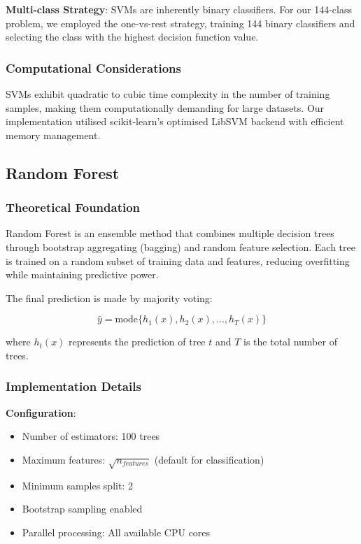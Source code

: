 \documentclass[11pt,a4paper]{article}
\begin{document}
\textbf{Multi-class Strategy}:
SVMs are inherently binary classifiers. For our 144-class problem, we employed the one-vs-rest strategy, training 144 binary classifiers and selecting the class with the highest decision function value.

\subsubsection{Computational Considerations}

SVMs exhibit quadratic to cubic time complexity in the number of training samples, making them computationally demanding for large datasets. Our implementation utilised scikit-learn's optimised LibSVM backend with efficient memory management.

\subsection{Random Forest}

\subsubsection{Theoretical Foundation}

Random Forest is an ensemble method that combines multiple decision trees through bootstrap aggregating (bagging) and random feature selection. Each tree is trained on a random subset of training data and features, reducing overfitting while maintaining predictive power.

The final prediction is made by majority voting:

\begin{equation}
\hat{y} = \text{mode}\{h_1(x), h_2(x), ..., h_T(x)\}
\end{equation}

where $h_t(x)$ represents the prediction of tree $t$ and $T$ is the total number of trees.

\subsubsection{Implementation Details}

\textbf{Configuration}:
\begin{itemize}
    \item Number of estimators: 100 trees
    \item Maximum features: $\sqrt{n_{features}}$ (default for classification)
    \item Minimum samples split: 2
    \item Bootstrap sampling enabled
    \item Parallel processing: All available CPU cores
\end{itemize}
\end{document}
